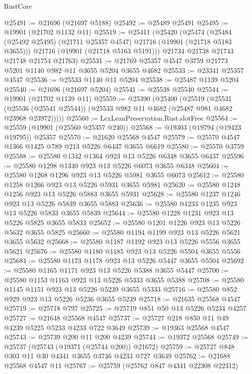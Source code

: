 \begin{lexlean}{RustCore}
\begin{coremodule}
@25491 := @21696 (@21697 @5188)
@25492 := @25489 @25491
@25495 := @19901 (@21702 @1132 @11)
@25519 := @25411
    (@25420
      (@25474
        (@25484 (@25492 @25495) (@21711 @25357 @4547) @21716 (@19901 (@21718 @5183 @3655)))
        @21716
        (@19901 (@21718 @5163 @5191)))
      @21734
      @21738
      @21743
      @21748
      @21754
      @21763)
@25531 := @21769 @25357 @4547 @3759 @21773 @5201 @1140 @982 @11 @3655 @5204 @3655 @4682
@25533 := @23341 @25357 @4547
@25536 := @25533 @1140 @11 @5204
@25538 := @25487 @1139 @5204
@25540 := @21696 (@21697 @5204)
@25541 := @25538 @25540
@25544 := @19901 (@21702 @1139 @11)
@25559 := @25390
    (@25400
      (@25519
        (@25531
          (@25536 (@25541 @25544))
          (@25533 @982 @11 @4682 (@25487 @981 @4682 @23968 @23972)))))
@25560 := LexLeanPreservation.Rust.slotFree
@25564 := @25559 (@19901 (@25560 @25357 @240))
@25568 := @19303 (@19794 (@19423 @19795)) @25357
@25570 := @21620 @25568 @4547
@25579 := @25570 @4547 @1366 @1425 @789 @213 @5226 @6437 @3655 @6619
@25580 := @25570 @3759
@25588 := @25580 @1342 @1364 @923 @13 @5226 @6348 @3655 @6437
@25596 := @25580 @1298 @1340 @923 @13 @5226 @6073 @3655 @6348
@25604 := @25580 @1268 @1296 @923 @13 @5226 @5981 @3655 @6073
@25612 := @25580 @1258 @1266 @923 @13 @5226 @5931 @3655 @5981
@25620 := @25580 @1248 @1256 @923 @13 @5226 @5883 @3655 @5931
@25628 := @25580 @1237 @1246 @923 @13 @5226 @5839 @3655 @5883
@25636 := @25580 @1233 @1235 @923 @13 @5226 @5833 @3655 @5839
@25644 := @25580 @1228 @1231 @923 @13 @5226 @5825 @3655 @5833
@25652 := @25580 @1201 @1226 @923 @13 @5226 @5632 @3655 @5825
@25660 := @25580 @1194 @1199 @923 @13 @5226 @5621 @3655 @5632
@25668 := @25580 @1187 @1192 @923 @13 @5226 @5556 @3655 @5621
@25676 := @25580 @1180 @1185 @923 @13 @5226 @5504 @3655 @5556
@25684 := @25580 @1173 @1178 @923 @13 @5226 @5447 @3655 @5504
@25692 := @25580 @1165 @1171 @923 @13 @5226 @5388 @3655 @5447
@25700 := @25580 @1153 @1163 @923 @13 @5226 @5333 @3655 @5388
@25708 := @25580 @1145 @1151 @923 @13 @5226 @5239 @3655 @5333
@25716 := @25580 @852 @929 @923 @13 @5226 @5236 @3655 @5239
@25718 := @21635 @25568 @4547
@25719 := @25718 @797
@25725 := @25719 @851 @50 @13 @5226 @5234 @4257
@25727 := @21648 @25568 @4547
@25737 := @25727 @218 @850 @11 @49 @4239 @5225 @5233 @4233 @722 @3649
@25739 := @19363 @25568 @4547
@25743 := @25739 @200 @11 @200 @4239
@25744 := @19372 @25568
@25749 := @25737 (@25743 (@19371 (@25744 @200)) @21672)
@25759 := @25727 @848 @303 @11 @30 @4341 @3655 @3746 @4233 @727 @3649
@25762 := @21688 @25568 @4547 @11
@25767 := @25759 (@25762 @847 @4341 @22308 @22312)

\end{coremodule}
\end{lexlean}
